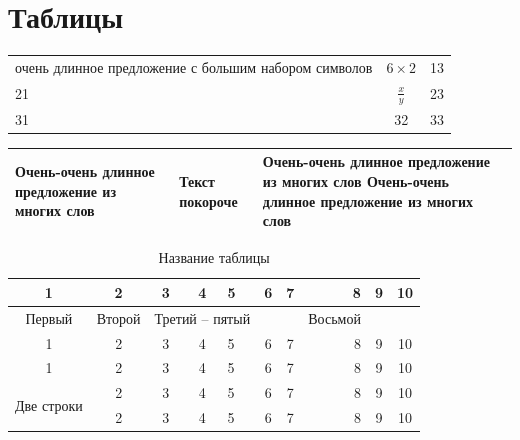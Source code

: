 \documentclass[russian]{beamer}
\begin{document}
\section{Таблицы}

\setlength{\extrarowheight}{6mm}

\begin{frame}
\begin{tabular}{|p{4cm}|c|r|}
	\hline
	 очень длинное предложение с большим набором символов & $6\times2$ & 13 \\
	 21 &  $\displaystyle\frac{x}{y}$ & 23 \\[6mm]
	\hline
	 31 & 32 & 33 \\
	\hline
\end{tabular}
\setlength{\extrarowheight}{0mm}
\end{frame}

\begin{frame}
	\begin{tabularx}{\textwidth}{|X|X|X|}
		\hline 
		Очень-очень длинное предложение из многих слов & Текст покороче & 
		Очень-очень длинное предложение из многих слов Очень-очень длинное предложение из многих слов \\
		\hline
	\end{tabularx}
\end{frame}

\begin{frame}
	\begin{table}[h]
		\begin{center}
			\caption{Название таблицы}
			\begin{tabular}{|c|c|c|c||l|c|c|r|c|c|}
				\hline
				1 & 2 & 3 & 4 & 5 & 6 & 7 & 8 & 9 & 10 \\ \hline
				Первый & Второй & \multicolumn{3}{|c|}{Третий -- пятый}
				& & & Восьмой & & \\
				\cline{1-7} \cline{9-10}
				1 & 2 & 3 & 4 & 5 & 6 & 7 & 8 & 9 & 10 \\ \hline \hline
				1 & 2 & 3 & 4 & 5 & 6 & 7 & 8 & 9 & 10 \\ \hline
				\multirow{2}{*}{Две строки} & 2 & 3 & 4 & 5 & 6 & 7 & 8 & 9 & 10 \\ \cline{2-10}
				& 2 & 3 & 4 & 5 & 6 & 7 & 8 & 9 & 10 \\  \hline
			\end{tabular}
		\end{center}
	\end{table}
\end{frame}
\end{document}

